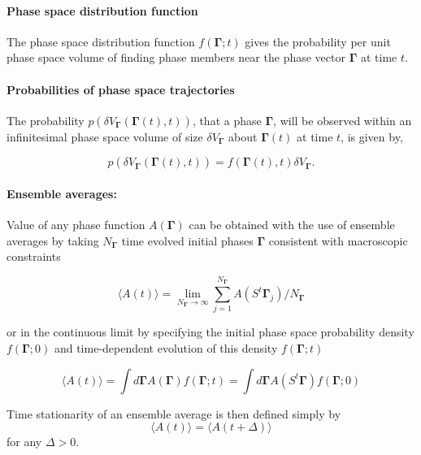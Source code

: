 \documentclass[a4paper,12pt,nofootinbib]{article}
\begin{document}
\paragraph{Phase space distribution function}

The phase space distribution function $f(\bm{\Gamma};t)$ gives the probability per unit phase space volume of finding phase members near the phase vector $\bm{\Gamma}$ at time $t$.

\paragraph{Probabilities of phase space trajectories }
The probability $p(\delta V_{\bm{\Gamma}}(\bm{\Gamma}(t),t))$, that a phase $\bm{\Gamma}$, will be observed within an infinitesimal phase space volume of size $\delta V_{\bm{\Gamma}}$ about $\bm{\Gamma}(t)$ at time $t$, is given by,

\begin{equation}
  p(\delta V_{\bm{\Gamma}}(\bm{\Gamma}(t),t)) = f(\bm{\Gamma}(t),t)\delta V_{\bm{\Gamma}}.
\end{equation}


\paragraph{Ensemble averages:}

Value of any phase function $A(\bm{\Gamma})$ can be obtained with the use of ensemble averages by taking $N_{\bm{\Gamma}} $ time evolved initial phases $\bm{\Gamma}$ consistent with macroscopic constraints

\begin{equation}
  \langle A(t) \rangle = \lim_{N_{\bm{\Gamma}}
 \to \infty} \sum_{j=1}^{N_{\bm{\Gamma}}} A(S^t \bm{\Gamma}_j)/N_{\bm{\Gamma}}
\end{equation}

or in the continuous limit by specifying the initial phase space probability density $f(\bm{\Gamma};0)$ and time-dependent evolution of this density $f(\bm{\Gamma};t)$

\begin{equation}
  \langle A(t) \rangle = \int d\bm{\Gamma} A(\bm{\Gamma}) f(\bm{\Gamma};t) = \int d\bm{\Gamma} A(S^t\bm{\Gamma})f(\bm{\Gamma};0)
\end{equation}

Time stationarity of an ensemble average is then defined simply by
\begin{equation}
\label{StationaryStateDef}
    \langle A(t) \rangle =   \langle A(t+\Delta) \rangle
\end{equation}
for any $\Delta > 0$.
\end{document}
